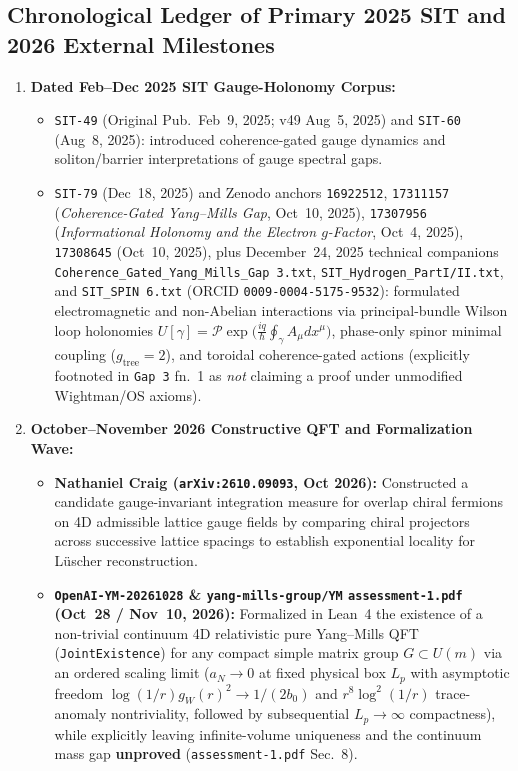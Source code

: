 \subsection{Chronological Ledger of Primary 2025 SIT and 2026 External Milestones}

\begin{enumerate}[leftmargin=2em]
  \item \textbf{Dated Feb--Dec 2025 SIT Gauge-Holonomy Corpus:}
  \begin{itemize}
    \item \texttt{SIT-49} (Original Pub.\ Feb~9, 2025; v49 Aug~5, 2025) and \texttt{SIT-60} (Aug~8, 2025): introduced coherence-gated gauge dynamics and soliton/barrier interpretations of gauge spectral gaps.
    \item \texttt{SIT-79} (Dec~18, 2025) and Zenodo anchors \texttt{16922512}, \texttt{17311157} (\emph{Coherence-Gated Yang--Mills Gap}, Oct~10, 2025), \texttt{17307956} (\emph{Informational Holonomy and the Electron $g$-Factor}, Oct~4, 2025), \texttt{17308645} (Oct~10, 2025), plus December~24, 2025 technical companions \texttt{Coherence\_\allowbreak{}Gated\_\allowbreak{}Yang\_\allowbreak{}Mills\_\allowbreak{}Gap 3.\allowbreak{}txt}, \texttt{SIT\_\allowbreak{}Hydrogen\_\allowbreak{}Part\allowbreak{}I/II.\allowbreak{}txt}, and \texttt{SIT\_SPIN 6.txt} (ORCID \texttt{0009-0004-5175-9532}): formulated electromagnetic and non-Abelian interactions via principal-bundle Wilson loop holonomies $U[\gamma] = \mathcal{P}\exp\bigl(\frac{iq}{\hbar}\oint_\gamma A_\mu dx^\mu\bigr)$, phase-only spinor minimal coupling ($g_{\mathrm{tree}} = 2$), and toroidal coherence-gated actions (explicitly footnoted in \texttt{Gap 3} fn.~1 as \emph{not} claiming a proof under unmodified Wightman/OS axioms).
  \end{itemize}
  \item \textbf{October--November 2026 Constructive QFT and Formalization Wave:}
  \begin{itemize}
    \item \textbf{Nathaniel Craig (\texttt{arXiv:2610.09093}, Oct 2026):} Constructed a candidate gauge-invariant integration measure for overlap chiral fermions on 4D admissible lattice gauge fields by comparing chiral projectors across successive lattice spacings to establish exponential locality for L\"uscher reconstruction.
    \item \textbf{\texttt{OpenAI-YM-20261028} \& \texttt{yang-mills-group/YM} \texttt{assessment-1.pdf} (Oct~28 / Nov~10, 2026):} Formalized in Lean~4 the existence of a non-trivial continuum 4D relativistic pure Yang--Mills QFT (\texttt{JointExistence}) for any compact simple matrix group $G \subset U(m)$ via an ordered scaling limit ($a_N \to 0$ at fixed physical box $L_p$ with asymptotic freedom $\log(1/r)g_W(r)^2 \to 1/(2b_0)$ and $r^8\log^2(1/r)$ trace-anomaly nontriviality, followed by subsequential $L_p \to \infty$ compactness), while explicitly leaving infinite-volume uniqueness and the continuum mass gap \textbf{unproved} (\texttt{assessment-1.pdf} Sec.~8).

\end{itemize}
\end{enumerate}
